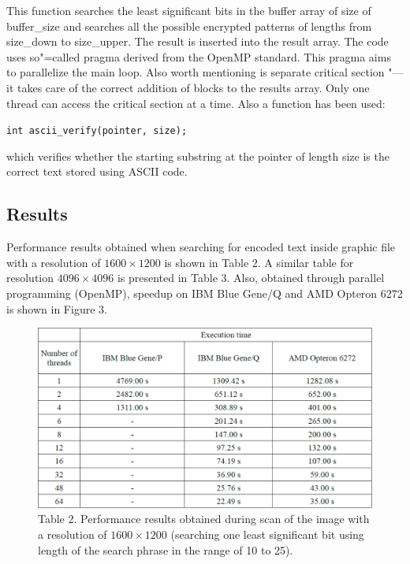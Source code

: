 \documentclass[10pt, a5paper]{article}
\begin{document}
This function searches the least significant bits in the buffer array of size of buffer\_size and searches all the possible encrypted patterns of lengths from size\_down to size\_upper. The result is inserted into the result array. The code uses so"=called pragma derived from the OpenMP standard. This pragma aims to parallelize the main loop. Also worth mentioning is separate critical section "--- it takes care of the correct addition of blocks to the results array. Only one thread can access the critical section at a time. Also a function has been used:

\verb!int ascii_verify(pointer, size);!

which verifies whether the starting substring at the pointer of length size is the correct text stored using ASCII code.

\subsection*{Results}

Performance results obtained when searching for encoded text inside graphic file with a resolution of $1600\times1200$ is shown in Table 2. A similar table for resolution $4096\times4096$ is presented in Table 3. Also, obtained through parallel programming (OpenMP), speedup on IBM Blue Gene/Q and AMD Opteron 6272 is shown in Figure 3.


\begin{figure}[h!]
  \centering
  \includegraphics[width=\textwidth]{103_2014_w_Kwiatkowska_time2.png}
  Table 2. Performance results obtained during scan of the image with a resolution of $1600\times1200$ (searching one least significant bit using length of the search phrase in the range of 10 to 25).
\end{figure}
\end{document}
